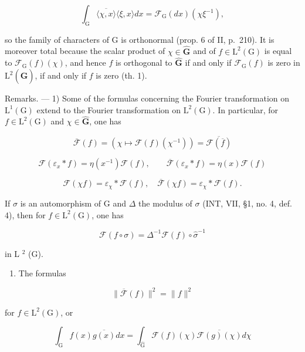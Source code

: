 \[
\int_ {\mathrm{G}} \overline {{\langle \chi , x \rangle}} \langle \xi , x \rangle d x = \mathcal {F} _ {\mathrm{G}} (d x) (\chi \xi^ {- 1}),
\]

so the family of characters of G is orthonormal (prop. 6 of II, p.~210). It is moreover total because the scalar product of \(\chi \in \widehat{\mathbf{G}}\) and of \(f \in \mathrm{L}^2(\mathrm{G})\) is equal to \(\mathcal{F}_{\mathrm{G}}(f)(\chi)\), and hence \(f\) is orthogonal to \(\widehat{\mathbf{G}}\) if and only if \(\mathcal{F}_{\mathrm{G}}(f)\) is zero in \(\mathrm{L}^2(\widehat{\mathbf{G}})\), if and only if \(f\) is zero (th. 1).

Remarks. --- 1) Some of the formulas concerning the Fourier transformation on \(\mathrm{L}^{1}(\mathrm{G})\) extend to the Fourier transformation on \(\mathrm{L}^{2}(\mathrm{G})\). In particular, for \(f \in \mathrm{L}^{2}(\mathrm{G})\) and \(\chi \in \widehat{\mathbf{G}}\), one has

\[
\overline {{\mathcal {F}}} (f) = (\chi \mapsto \mathcal {F} (f) (\chi^ {- 1})) = \overline {{\mathcal {F} (\overline {{f}})}}
\]

\[
\mathcal {F} (\varepsilon_ {x} * f) = \eta (x ^ {- 1}) \mathcal {F} (f), \qquad \overline {{\mathcal {F}}} (\varepsilon_ {x} * f) = \eta (x) \mathcal {F} (f)
\]

\[
\mathcal {F} (\chi f) = \varepsilon_ {\chi} * \mathcal {F} (f), \quad \overline {{\mathcal {F}}} (\chi f) = \varepsilon_ {\chi} * \mathcal {F} (f).
\]

If \(\sigma\) is an automorphism of G and \(\Delta\) the modulus of \(\sigma\) (INT, VII, §1, no. 4, def. 4), then for \(f \in \mathrm{L}^2(\mathrm{G})\), one has

\[
\mathcal {F} (f \circ \sigma) = \Delta^ {- 1} \mathcal {F} (f) \circ \widehat {\sigma} ^ {- 1}
\]

in L \(^{2}\) (G).

\begin{enumerate}
\def\labelenumi{\arabic{enumi})}
\setcounter{enumi}{1}
\tightlist
\item
  The formulas
\end{enumerate}

\[
\| \overline {{\mathcal {F}}} (f) \| ^ {2} = \| f \| ^ {2}\tag{23}
\]

for \(f\in \mathrm{L}^2 (\mathrm{G})\), or

\[
\int_ {\mathrm{G}} f (x) \overline {{g (x)}} d x = \int_ {\widehat {\mathrm{G}}} \mathcal {F} (f) (\chi) \overline {{\mathcal {F} (g) (\chi)}} d \chi\tag{24}
\]

